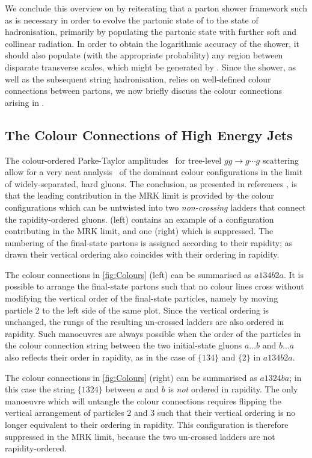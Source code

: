 We conclude this overview on \HEJ by reiterating that 
a parton shower framework such as \py\cite{Sjostrand:2014zea} is
necessary in order to evolve the partonic state of \HEJ to the state of
hadronisation, primarily by populating the partonic state with further soft
and collinear radiation. In order to obtain the logarithmic accuracy of the shower, it
should also populate (with the appropriate probability) any region between
disparate transverse scales,
which might be generated by \HEJ. Since the shower, as well as the subsequent string
hadronisation, relies on well-defined colour connections between
partons, we now briefly discuss the colour connections arising in \HEJ.

\subsection{The Colour Connections of High Energy Jets}
\label{sec:colo-conn-high}
The colour-ordered Parke-Taylor amplitudes~\cite{Parke:1986gb} for tree-level
$gg\to g\cdots g$ scattering allow for a very neat
analysis~\cite{DelDuca:1993pp,DelDuca:1995zy} of the dominant colour
configurations in the limit of widely-separated, hard gluons. The
conclusion, as presented in references \cite{DelDuca:1993pp,DelDuca:1995zy}, is
that the leading contribution in the MRK limit is provided by the colour configurations which can be untwisted
into two \textit{non-crossing} ladders that connect the rapidity-ordered
gluons.  (left) contains an example of a configuration
contributing in the MRK limit, and one (right) which is suppressed. The
numbering of the final-state partons is assigned according to their rapidity; as drawn their vertical ordering also 
coincides with their ordering in rapidity.



The colour connections in \cref{fig:Colours} (left) can be summarised as
$a134b2a$. It is possible to arrange the final-state partons such that no colour lines cross 
without modifying the vertical order of the final-state particles, namely by moving particle 2
to the left side of the same plot. Since the vertical ordering is unchanged,
the rungs of the resulting
un-crossed ladders are also ordered in rapidity.
Such manoeuvres are always possible when the order of the particles 
in the colour connection string between the two
initial-state gluons $a \dots b$ and $b \dots a$  
also reflects their order in rapidity, as in the case of $\{134\}$ and $\{2\}$
in $a134b2a$. 

The colour connections in \cref{fig:Colours} (right) can be
summarised as $a1324ba$; in this case the string $\{1324\}$ between
 $a$ and $b$ is \textit{not} ordered in rapidity. The only manoeuvre
 which will untangle the colour connections requires flipping the vertical arrangement of
particles $2$ and $3$ such that their vertical ordering is no longer equivalent to their ordering in rapidity. 
This configuration is therefore suppressed in the
MRK limit, because the two un-crossed ladders are not rapidity-ordered.

